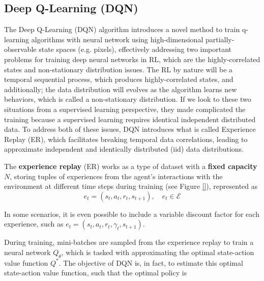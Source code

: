 


\subsection{Deep Q-Learning (DQN)}
\label{sec:dqn}
The Deep Q-Learning (DQN) \cite{mnih2013playing, mnih2015human} algorithm introduces a novel method to train q-learning algorithms with neural network using high-dimensional partially-observable state spaces (e.g. pixels), effectively addressing two important problems for training deep neural networks in RL, which are the highly-correlated states and non-stationary distribution issues. The RL by nature will be a temporal sequential process, which produces highly-correlated states, and additionally; the data distribution will evolves as the algorithm learns new behaviors, which is called a non-stationary distribution. If we look to these two situations from a supervised learning perspective, they made complicated the training because a supervised learning requires identical independent distributed data. To address both of these issues, DQN introduces what is called Experience Replay (ER), which facilitates breaking temporal data correlations, leading to approximate independent and identically distributed (iid) data distributions.

The \textbf{experience replay} (ER) works as a type of dataset with a \textbf{fixed capacity} $N$, storing tuples of experiences from the agent's interactions with the environment at different time steps during training (see Figure \ref{}), represented as
$$e_t = (s_t, a_t, r_t, s_{t+1}), \quad e_t \in \mathcal{E}$$

In some scenarios, it is even possible to include a variable discount factor for each experience, such as $e_t = (s_t, a_t, r_t, \gamma_t, s_{t+1})$.

During training, mini-batches are sampled from the experience replay to train a neural network $Q_\theta$, which is tasked with approximating the optimal state-action value function $Q^*$. The objective of DQN is, in fact, to estimate this optimal state-action value function, such that the optimal policy is

